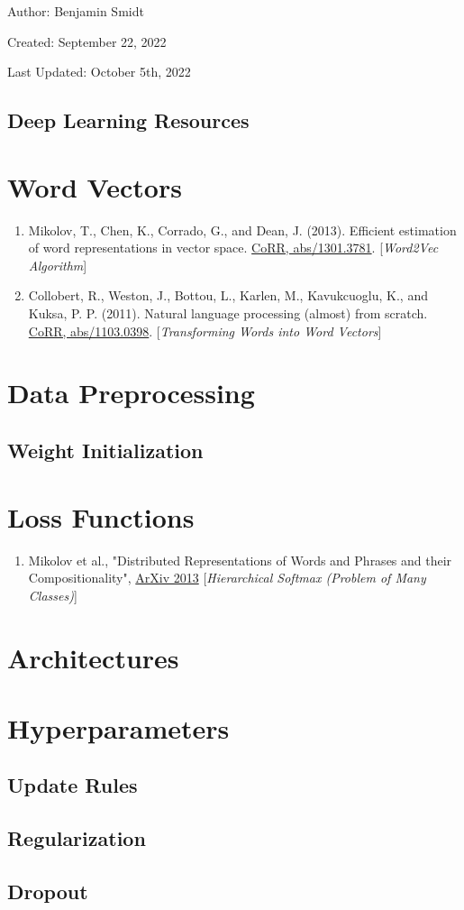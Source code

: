 \documentclass[12pt]{article}
\begin{document}
\noindent Author: Benjamin Smidt

\noindent Created: September 22, 2022

\noindent Last Updated: October 5th, 2022
\begin{center}
\section*{Deep Learning Resources}
\end{center}

\tableofcontents{}

\section{Word Vectors}
\begin{enumerate}
\item Mikolov, T., Chen, K., Corrado, G., and Dean, J. (2013). 
    Efficient estimation of word representations in vector space. 
    \href{https://arxiv.org/abs/1301.3781}{CoRR, abs/1301.3781}. 
    [\emph{Word2Vec Algorithm}]
\item Collobert, R., Weston, J., Bottou, L., Karlen, M., Kavukcuoglu, K., and Kuksa, P. P. 
    (2011). Natural language processing (almost) from scratch. 
    \href{https://arxiv.org/abs/1103.0398}{CoRR, abs/1103.0398}.
    [\emph{Transforming Words into Word Vectors}]
\end{enumerate}

\section{Data Preprocessing}

\subsection{Weight Initialization}

\section{Loss Functions}
\begin{enumerate}
\item Mikolov et al., 
    "Distributed Representations of Words and Phrases and their
    Compositionality", 
    \href{https://arxiv.org/abs/1310.4546}{ArXiv 2013}
    [\emph{Hierarchical Softmax (Problem of Many Classes)}]
\end{enumerate}


\section{Architectures}

\section{Hyperparameters}
\subsection{Update Rules}

\subsection{Regularization}

\subsection{Dropout}
\end{document}
